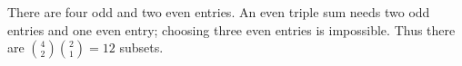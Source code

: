 There are four odd and two even entries. An even triple sum needs two odd entries and one even entry; choosing three even entries is impossible. Thus there are $\binom42\binom21=\boxed{12}$ subsets.
